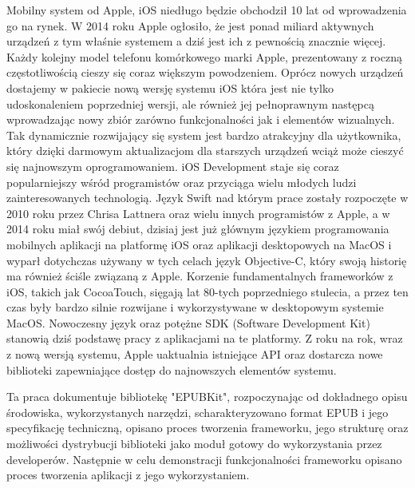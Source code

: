 Mobilny system od Apple, iOS niedługo będzie obchodził 10 lat od wprowadzenia go na rynek. W 2014 roku Apple ogłosiło, że jest ponad miliard aktywnych urządzeń z tym właśnie systemem a dziś jest ich z pewnością znacznie więcej. Każdy kolejny model telefonu komórkowego marki Apple, prezentowany z roczną częstotliwością cieszy się coraz większym powodzeniem. Oprócz nowych urządzeń dostajemy w pakiecie nową wersję systemu iOS która jest nie tylko udoskonaleniem poprzedniej wersji, ale również jej pełnoprawnym następcą wprowadzając nowy zbiór zarówno funkcjonalności jak i elementów wizualnych. Tak dynamicznie rozwijający się system jest bardzo atrakcyjny dla użytkownika, który dzięki darmowym aktualizacjom dla starszych urządzeń wciąż może cieszyć się najnowszym oprogramowaniem. iOS Development staje się coraz popularniejszy wśród programistów oraz przyciąga wielu młodych ludzi zainteresowanych technologią. Język Swift nad którym prace zostały rozpoczęte w 2010 roku przez Chrisa Lattnera oraz wielu innych programistów z Apple, a w 2014 roku miał swój debiut, dzisiaj jest już głównym językiem programowania mobilnych aplikacji na platformę iOS oraz aplikacji desktopowych na MacOS i wyparł dotychczas używany w tych celach język Objective-C, który swoją historię ma również ściśle związaną z Apple. Korzenie fundamentalnych frameworków z iOS, takich jak CocoaTouch, sięgają lat 80-tych poprzedniego stulecia, a przez ten czas były bardzo silnie rozwijane i wykorzystywane w desktopowym systemie MacOS. Nowoczesny język oraz potężne SDK (Software Development Kit) stanowią dziś podstawę pracy z aplikacjami na te platformy. Z roku na rok, wraz z nową wersją systemu, Apple uaktualnia istniejące API oraz dostarcza nowe biblioteki zapewniające dostęp do najnowszych elementów systemu.

Ta praca dokumentuje bibliotekę "EPUBKit", rozpoczynając od dokładnego opisu środowiska, wykorzystanych narzędzi, scharakteryzowano format EPUB i jego specyfikację techniczną, opisano proces tworzenia frameworku, jego strukturę oraz możliwości dystrybucji biblioteki jako moduł gotowy do wykorzystania przez developerów. Następnie w celu demonstracji funkcjonalności frameworku opisano proces tworzenia aplikacji z jego wykorzystaniem.
